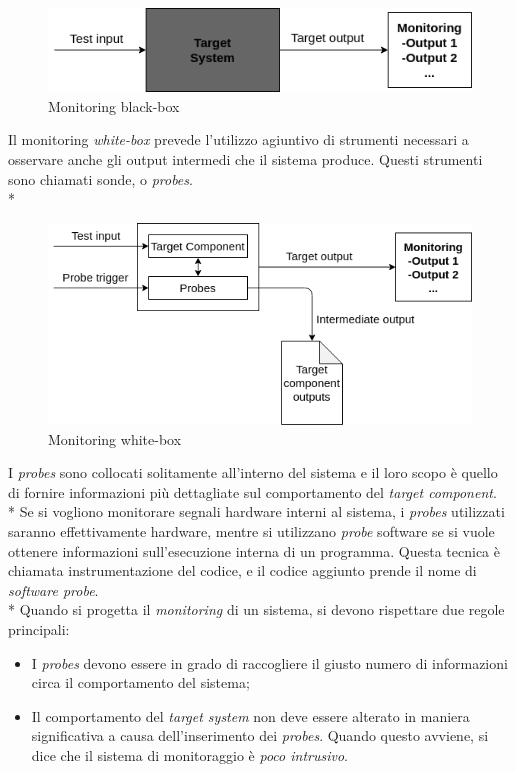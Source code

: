 \begin{figure}[h]
	\centering
	\includegraphics[width=0.7\linewidth]{img/blackbox}
	\caption{Monitoring black-box}
	\label{fig:blackbox}
\end{figure}
\FloatBarrier
Il monitoring \emph{white-box} prevede l'utilizzo agiuntivo di strumenti necessari a osservare anche gli output intermedi che il sistema produce. Questi strumenti sono chiamati sonde, o \emph{probes}.\\*
\begin{figure}[h]
	\centering
	\includegraphics[width=0.7\linewidth]{img/whitebox}
	\caption{Monitoring white-box}
	\label{fig:whitebox}
\end{figure}
\FloatBarrier
I \emph{probes} sono collocati solitamente all'interno del sistema e il loro scopo \`e quello di fornire informazioni pi\`u dettagliate sul comportamento del \emph{target component}.\\*
Se si vogliono monitorare segnali hardware interni al sistema, i \emph{probes} utilizzati saranno effettivamente hardware, mentre si utilizzano \emph{probe} software se si vuole ottenere informazioni sull'esecuzione interna di un programma. Questa tecnica \`e chiamata instrumentazione del codice, e il codice aggiunto prende il nome di \emph{software probe}.\\*
Quando si progetta il \emph{monitoring} di un sistema, si devono rispettare due regole principali:
\begin{itemize}
	\item I \emph{probes} devono essere in grado di raccogliere il giusto numero di informazioni circa il comportamento del sistema;
	\item Il comportamento del \emph{target system} non deve essere alterato in maniera significativa a causa dell'inserimento dei \emph{probes}. Quando questo avviene, si dice che il sistema di monitoraggio \`e \emph{poco intrusivo}.
\end{itemize}
